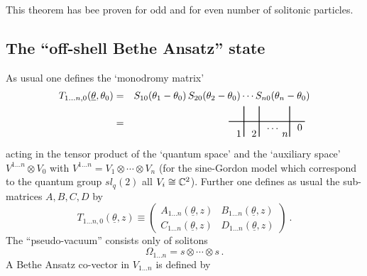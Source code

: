 \documentclass[a4paper,12pt]{article}
\begin{document}
This theorem has bee proven for odd \cite{BFKZ} and for even \cite{BK} number
of solitonic particles.

\subsection*{The ``off-shell Bethe Ansatz'' state}

As usual one defines the `monodromy matrix' 
\begin{eqnarray*}
T_{1\dots n,0}({\underline{\theta }},\theta _{0}) &=&S_{10}(\theta
_{1}-\theta _{0})\,S_{20}(\theta _{2}-\theta _{0})\cdots S_{n0}(\theta
_{n}-\theta _{0}) \\
&=& 
\begin{array}{c}
\unitlength2.7mm\begin{picture}(10,4)\thicklines \put(0,2){\line(1,0){10}}
\put(2,0){\line(0,1){4}} \put(4,0){\line(0,1){4}} \put(8,0){\line(0,1){4}}
\put(1,0){$1$} \put(3,0){$ 2$} \put(7,0){$ n$} \put(9,.8){$ 0$}
\put(5,1){$\dots$} \end{picture}
\end{array}
\end{eqnarray*}
acting in the tensor product of the `quantum space' and the `auxiliary
space' $V^{1\dots n}\otimes V_{0}$ with $V^{1\dots n}=V_{1}\otimes \cdots
\otimes V_{n}$ (for the sine-Gordon model which correspond to the quantum
group $sl_{q}(2)$ all $V_{i}\cong \Bbb{C}^{2}$). Further one defines as
usual the sub-matrices $A,B,C,D$ by 
\[
T_{1\dots n,0}({\underline{\theta }},z)\equiv \left( 
\begin{array}{cc}
A_{1\dots n}({\underline{\theta }},z) & B_{1\dots n}({\underline{\theta }},z)
\\ 
C_{1\dots n}({\underline{\theta }},z) & D_{1\dots n}({\underline{\theta }},z)
\end{array}
\right) ~. 
\]
The ``pseudo-vacuum'' consists only of solitons 
\[
\Omega _{1\dots n}=s\otimes \cdots \otimes s\,. 
\]
A Bethe Ansatz co-vector in $V_{1\dots n}$ is defined by 
\end{document}
